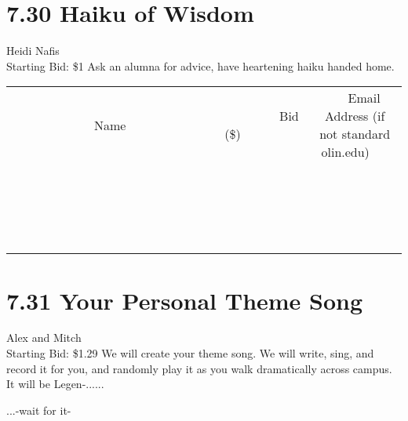 \documentclass[11pt]{article}
\begin{document}
\section*{7.30 Haiku of Wisdom}
Heidi Nafis
\\
Starting Bid: \$1
\newline
Ask an alumna for advice, have heartening haiku handed home.
\\[3ex]
\begin{tabular}{c c c}
~~~~~~~~~~~~~Name~~~~~~~~~~~~~ & ~~~~~~~~~Bid (\$)~~~~~~~~~  & ~~~Email Address (if not standard olin.edu)~~~\\
 & & \\
\hline
 & & \\
\hline
 & & \\
\hline
 & & \\
\hline
 & & \\
\hline
 & & \\
\hline
 & & \\
\hline
 & & \\
\hline
 & & \\
\hline
 & & \\
\hline
 & & \\
\hline
 & & \\
\hline
 & & \\
\hline
 & & \\
\hline
 & & \\
\hline
 & & \\
\hline
 & & \\
\hline
 & & \\
\hline
 & & \\
\hline
\end{tabular}
\newpage
\section*{7.31 Your Personal Theme Song}
Alex and Mitch
\\
Starting Bid: \$1.29
\newline
We will create your theme song. We will write, sing, and record it for you, and randomly play it as you walk dramatically across campus. It will be Legen-......


...-wait for it-
\end{document}
